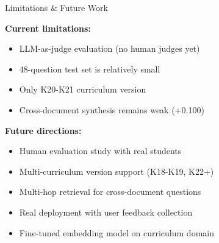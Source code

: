 \documentclass[aspectratio=169,10pt]{beamer}
\begin{document}
\begin{frame}{Limitations \& Future Work}

\textbf{Current limitations:}
\begin{itemize}
    \item LLM-as-judge evaluation (no human judges yet)
    \item 48-question test set is relatively small
    \item Only K20-K21 curriculum version
    \item Cross-document synthesis remains weak (+0.100)
\end{itemize}

\vspace{0.7em}
\textbf{Future directions:}
\begin{itemize}
    \item Human evaluation study with real students
    \item Multi-curriculum version support (K18-K19, K22+)
    \item Multi-hop retrieval for cross-document questions
    \item Real deployment with user feedback collection
    \item Fine-tuned embedding model on curriculum domain
\end{itemize}

\end{frame}
\end{document}
